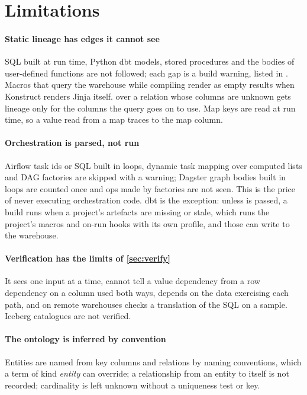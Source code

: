 \section{Limitations}
\label{sec:limitations}

\paragraph{Static lineage has edges it cannot see} SQL built at run time, Python dbt models,
stored procedures and the bodies of user-defined functions are not followed; each gap is a build
warning, listed in . Macros that query the warehouse while compiling render as
empty results when Konstruct renders Jinja itself.  over a relation whose columns
are unknown gets lineage only for the columns the query goes on to use. Map keys are read at run
time, so a value read from a map traces to the map column.

\paragraph{Orchestration is parsed, not run} Airflow task ids or SQL built in loops, dynamic task
mapping over computed lists and DAG factories are skipped with a warning; Dagster graph bodies
built in loops are counted once and ops made by factories are not seen. This is the price of never
executing orchestration code. dbt is the exception: unless  is passed, a build runs
 when a project's artefacts are missing or stale, which runs the project's
macros and on-run hooks with its own profile, and those can write to the warehouse.

\paragraph{Verification has the limits of \cref{sec:verify}} It sees one input at a time, cannot
tell a value dependency from a row dependency on a column used both ways, depends on the data
exercising each path, and on remote warehouses checks a translation of the SQL on a sample.
Iceberg catalogues are not verified.

\paragraph{The ontology is inferred by convention} Entities are named from key columns and
relations by naming conventions, which a term of kind \emph{entity} can override; a relationship
from an entity to itself is not recorded; cardinality is left unknown without a uniqueness test or
key.

